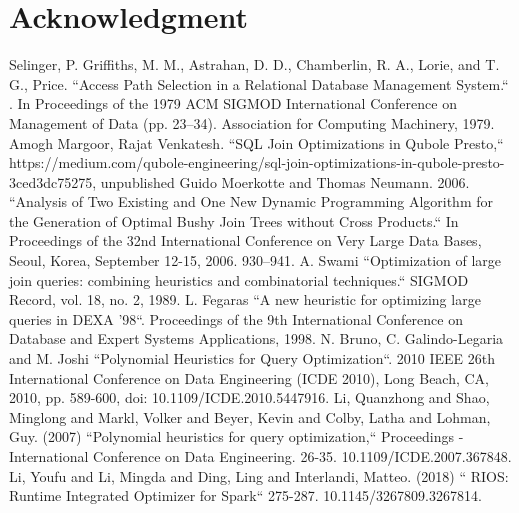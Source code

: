 \documentclass[conference]{IEEEtran}
\begin{document}








\section*{Acknowledgment}

\begin{thebibliography}{00}
 Selinger, P. Griffiths, M. M., Astrahan, D. D., Chamberlin, R. A., Lorie, and T. G., Price. ``Access Path Selection in a Relational Database Management System.`` . In Proceedings of the 1979 ACM SIGMOD International Conference on Management of Data (pp. 23–34). Association for Computing Machinery, 1979.
 Amogh Margoor, Rajat Venkatesh. ``SQL Join Optimizations in Qubole Presto,``
https://medium.com/qubole-engineering/sql-join-optimizations-in-qubole-presto-3ced3dc75275, unpublished
 Guido Moerkotte and Thomas Neumann. 2006. ``Analysis of Two Existing and One New Dynamic Programming Algorithm for the Generation of Optimal Bushy Join Trees without Cross Products.`` In Proceedings of the 32nd International Conference on Very Large Data Bases, Seoul, Korea, September 12-15, 2006. 930–941.
 A. Swami ``Optimization of large join queries: combining heuristics and
combinatorial techniques.`` SIGMOD Record, vol. 18, no. 2, 1989.
 L. Fegaras ``A new heuristic for optimizing large queries in DEXA ’98``. Proceedings of the 9th International Conference on Database and Expert Systems Applications, 1998.
 N. Bruno, C. Galindo-Legaria and M. Joshi ``Polynomial Heuristics for Query Optimization``. 2010 IEEE 26th International Conference on Data Engineering (ICDE 2010), Long Beach, CA, 2010, pp. 589-600, doi: 10.1109/ICDE.2010.5447916.
 Li, Quanzhong and Shao, Minglong and Markl, Volker and Beyer, Kevin and Colby, Latha and Lohman, Guy. (2007)  ``Polynomial heuristics for query optimization,`` Proceedings - International Conference on Data Engineering. 26-35. 10.1109/ICDE.2007.367848.
 Li, Youfu and Li, Mingda and Ding, Ling and Interlandi, Matteo. (2018)  `` RIOS: Runtime Integrated Optimizer for Spark`` 275-287. 10.1145/3267809.3267814.
\end{thebibliography}
\end{document}
